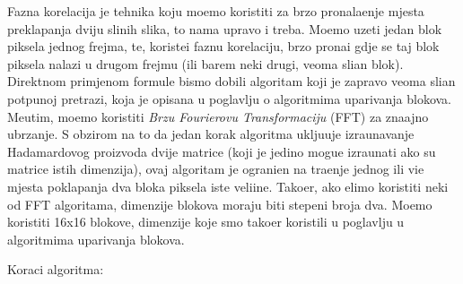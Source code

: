 Fazna korelacija je tehnika koju mo\zh emo koristiti za brzo pronala\zh enje mjesta preklapanja dviju sli\ch nih slika, \sh to nama upravo i treba. Mo\zh emo uzeti jedan blok piksela jednog frejma, te, koriste\cj i faznu korelaciju, brzo prona\cj i
gdje se taj blok piksela nalazi u drugom frejmu (ili barem neki drugi, veoma sli\ch an blok). Direktnom primjenom formule bismo dobili algoritam koji je zapravo veoma sli\ch an potpunoj pretrazi, koja je opisana u poglavlju o algoritmima
uparivanja blokova. Me\dj utim, mo\zh emo koristiti \textit{Brzu Fourierovu Transformaciju} (FFT) za zna\ch ajno ubrzanje. S obzirom na to da jedan korak algoritma uklju\ch uje izra\ch unavanje Hadamardovog proizvoda dvije matrice
(koji je jedino mogu\cj e izra\ch unati ako su matrice istih dimenzija), ovaj algoritam je ograni\ch en na tra\zh enje jednog ili vi\sh e mjesta poklapanja dva bloka piksela iste veli\ch ine. Tako\dj er, ako \zh elimo koristiti neki od FFT algoritama,
dimenzije blokova moraju biti stepeni broja dva. Mo\zh emo koristiti 16x16 blokove, dimenzije koje smo tako\dj er koristili u poglavlju u algoritmima uparivanja blokova. 

Koraci algoritma:

